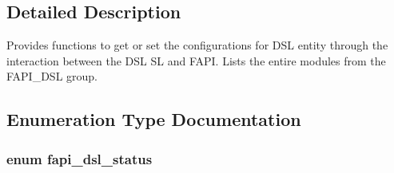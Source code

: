 \subsection{Detailed Description}
Provides functions to get or set the configurations for D\-S\-L entity through the interaction between the D\-S\-L S\-L and F\-A\-P\-I. Lists the entire modules from the F\-A\-P\-I\-\_\-\-D\-S\-L group. 

\subsection{Enumeration Type Documentation}
\hypertarget{group__FAPI__DSL_ga6a68d961535e6f7aa239751763131a70}{
\subsubsection[{fapi\-\_\-dsl\-\_\-status}]{\setlength{\rightskip}{0pt plus 5cm}enum {\bf fapi\-\_\-dsl\-\_\-status}}}\label{group__FAPI__DSL_ga6a68d961535e6f7aa239751763131a70}
